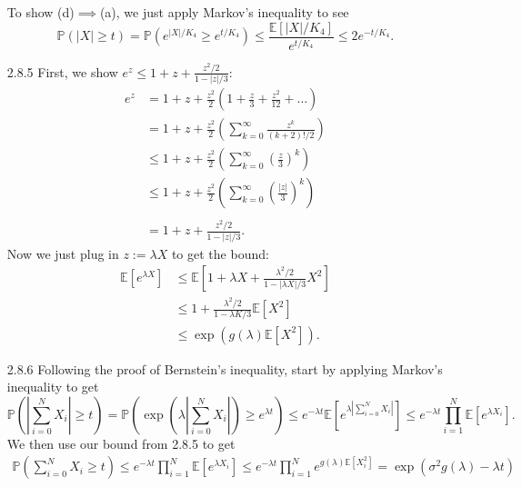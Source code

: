 \documentclass[11pt]{article}
\def\Pp{\mathbb P}
\def\E{\mathbb E}
\begin{document}
\begin{enumerate}
	To show (d)$ \implies $(a), we just apply Markov's inequality to see
	\[ \Pp (|X| \geq t) = \Pp(e^{|X|/K_4} \geq e^{t/K_4}) \leq \frac{\E[|X|/K_4]}{e^{t/K_4}} \leq 2e^{-t/K_4}. \]

\item[2.8.5]\label{2.8.5} First, we show $ e^z \leq 1 + z  + \frac{z^2/2}{1-|z|/3} $:
\begin{align*}
	e^z &= 1 + z +\frac{z^2}{2}\left(1 + \frac{z}{3} + \frac{z^2}{12} + \ldots\right)\\
	&= 1 + z +\frac{z^2}{2}\left( \sum_{k=0}^\infty \frac{z^k}{(k+2)!/2} \right)\\
	&\leq 1 + z +\frac{z^2}{2}\left( \sum_{k=0}^\infty \left(\frac{z}{3}\right)^k \right)\\
	&\leq 1 + z +\frac{z^2}{2}\left( \sum_{k=0}^\infty \left(\frac{|z|}{3}\right)^k \right)\\\\
	&= 1 + z + \frac{z^2/2}{1-|z|/3}.
\end{align*}
Now we just plug in $ z:=\lambda X $ to get the bound:
\begin{align*}
	\E[e^{\lambda X}] &\leq \E[1 + \lambda X + \frac{\lambda^2/2}{1-|\lambda X|/3}X^2]\\
	&\leq 1 + \frac{\lambda^2/2}{1-\lambda K/3}\E[X^2]\\
	&\leq \exp(g(\lambda)\E[X^2]).
\end{align*}

\item[2.8.6] Following the proof of Bernstein's inequality, start by applying Markov's inequality to get
\[ \Pp \left(\left|\sum_{i=0}^{N} X_i \right| \geq t\right) = \Pp \left(\exp\left(\lambda\left|\sum_{i=0}^{N} X_i \right| \right) \geq e^{\lambda t}\right) \leq e^{-\lambda t} \E\left[ e^{\lambda |\sum_{i=0}^{N} X_i|} \right] \leq e^{-\lambda t} \prod_{i=1}^{N} \E\left[ e^{\lambda X_i} \right]. \]
We then use our bound from 2.8.5 to get
\begin{align*}
	\Pp \left(\sum_{i=0}^{N} X_i \geq t\right) \leq e^{-\lambda t} \prod_{i=1}^{N} \E\left[ e^{\lambda X_i} \right] \leq e^{-\lambda t} \prod_{i=1}^{N} e^{g(\lambda)\E\left[ X_i^2 \right]} = \exp \left( \sigma^2 g(\lambda) - \lambda t \right)
\end{align*}


\end{enumerate}
\end{document}
